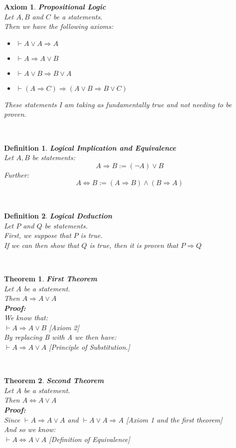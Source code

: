 \documentclass[12pt]{extarticle}
\theoremstyle{plain}
\newtheorem{thm}{Theorem}[section]
\theoremstyle{plain}
\newtheorem{axiom}{Axiom}[section]
\theoremstyle{plain}
\theoremstyle{Definition}
\newtheorem{def.}{Definition}[section]
\theoremstyle{Definition}
\theoremstyle{plain}
\newcommand{\cut}[0]{\noindent\framebox[\linewidth]{\rule{\linewidth}{2pt}}\\}
\begin{document}
\begin{axiom} \textbf{Propositional Logic} \\ 
	Let $A,B$ and $C$ be a statements.\\
	Then we have the following axioms: 
	\begin{itemize}
		\item $\vdash A \lor A \Rightarrow A$ 
		\item $\vdash A \Rightarrow A \lor B$ 
		\item $\vdash A \lor B \Rightarrow B \lor A$ 
		\item $\vdash (A \Rightarrow C) \Rightarrow ( A \lor B \Rightarrow B \lor C ) $
	\end{itemize}
	These statements I am taking as fundamentally true and not needing to be proven. 
\end{axiom}
\cut
\begin{def.} \textbf{Logical Implication and Equivalence} \\
	Let $A,B$ be statements: 
	$$A \Rightarrow B := (\lnot A) \lor B$$
	Further: 
	$$A \Leftrightarrow B := (A \Rightarrow B) \wedge (B \Rightarrow A)$$
\end{def.}
\cut
\begin{def.} \textbf{Logical Deduction} \\
	Let $P$ and $Q$ be statements. \\ 
	First, we suppose that $P$ is true. \\
	If we can then show that $Q$ is true, then it is proven that $P \Rightarrow Q$
\end{def.}
\cut
\begin{thm} \textbf{First Theorem} \\ 
	Let $A$ be a statement. \\ 
	Then $A \Rightarrow A \lor A $ \\ 
	\textbf{Proof:} \\ 
	We know that: \\ 
	$\vdash A \Rightarrow A \lor B$ \hfill [Axiom 2]\\ 
	By replacing B with A we then have: \\ 
	$\vdash A \Rightarrow A \lor A$ \hfill [Principle of Substitution.] 
\end{thm}
\cut
\begin{thm} \textbf{Second Theorem} \\
	Let $A$ be a statement. \\ 
	Then $A \Leftrightarrow A \lor A $ \\ 	
	\textbf{Proof:} \\
	Since $\vdash A \Rightarrow A \lor A$ and $\vdash A \lor A \Rightarrow A$ \hfill [Axiom 1 and the first theorem]\\
	And so we know: \\
	$\vdash A \Leftrightarrow A \lor A$ \hfill [Definition of Equivalence]
\end{thm}
\end{document}
